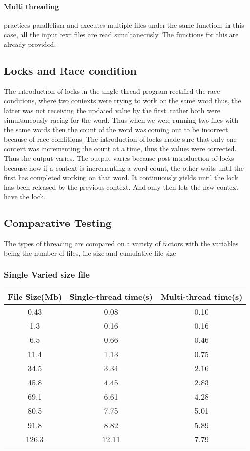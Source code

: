 \documentclass{article}
\begin{document}
\paragraph{Multi threading} practices parallelism and executes multiple files under the same function,  in this case, all the input text files are read simultaneously. The functions for this are already provided.

\subsection{Locks and Race condition}
The introduction of locks in the single thread program rectified the race conditions, where two contexts were trying to work on the same word thus, the latter was not receiving the updated value by the first, rather both were simultaneously racing for the word. Thus when we were running two files with the same words then the count of the word was coming out to be incorrect because of race conditions. The introduction of locks made sure that only one context was incrementing the count at a time, thus the values were corrected. Thus the output varies. The output varies because  post introduction of locks because now if a context is incrementing a word count, the other waits until the first has completed working on that word. It continuously yields until the lock has been released by the previous context. And only then lets the new context have the lock.

\subsection{Comparative Testing}

The types of threading are compared on a variety of factors with the variables being the number of files, file size and cumulative file size 


\subsubsection{Single Varied size file}
\begin{tabular}{|c|c|c|}
\hline
 File Size(Mb) & Single-thread time(s) & Multi-thread time(s) \\
\hline
 0.43 & 0.08 & 0.10 \\
\hline
 1.3 & 0.16 & 0.16 \\
\hline
 6.5 & 0.66 & 0.46 \\
\hline
 11.4 & 1.13 & 0.75 \\
\hline
 34.5 & 3.34 & 2.16 \\
\hline
 45.8 & 4.45 & 2.83 \\
\hline
 69.1 & 6.61 & 4.28 \\
\hline
 80.5 & 7.75 & 5.01 \\
\hline
 91.8 & 8.82 & 5.89 \\
\hline
 126.3 & 12.11 & 7.79 \\
\hline
\end{tabular}
\end{document}

